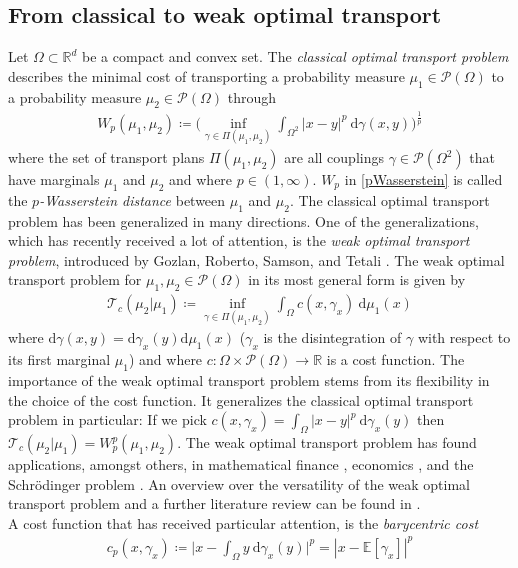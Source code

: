 \documentclass[letterpaper]{amsart}
\newcommand{\RR}{\mathbb{R}}
\newcommand{\EE}{\mathbb{E}}
\newcommand{\dd}{\mathrm{d}}
\theoremstyle{definition}
\begin{document}
\subsection{From classical to weak optimal transport}
Let $\Omega\subset\RR^d$ be a compact and convex set.
The \textit{classical optimal transport problem} describes the minimal cost of transporting a probability measure $\mu_1\in\mathcal P(\Omega)$ to a probability measure $\mu_2\in\mathcal P(\Omega)$ through
\begin{gather}\label{pWasserstein}
	W_p(\mu_1,\mu_2)\coloneqq \Big(\inf_{\gamma\in\Pi(\mu_1,\mu_2)}\int_{\Omega^2} |x-y|^p\ \dd\gamma(x,y)\Big)^{\frac{1}{p}}
\end{gather}
where the set of transport plans $\Pi(\mu_1,\mu_2)$ are all couplings $\gamma\in\mathcal P(\Omega^2)$ that have marginals $\mu_1$ and $\mu_2$ and where $p\in (1,\infty)$. $W_p$ in \eqref{pWasserstein} is called the \textit{$p$-Wasserstein distance} between $\mu_1$ and $\mu_2$. The classical optimal transport problem has been generalized in many directions. One of the generalizations, which has recently received a lot of attention, is the \textit{weak optimal transport problem}, introduced by Gozlan, Roberto, Samson, and Tetali \cite{gozlan2017}. The weak optimal transport problem for $\mu_1,\mu_2\in\mathcal P(\Omega)$ in its most general form is given by
\begin{gather*}
	\mathcal T_c(\mu_2|\mu_1)\coloneqq \inf_{\gamma\in\Pi(\mu_1,\mu_2)}\int_{\Omega}c(x,\gamma_x)\ \dd\mu_1(x)
\end{gather*}
where $\dd\gamma(x,y)=\dd \gamma_x(y)\dd\mu_1(x)$ ($\gamma_x$ is the disintegration of $\gamma$ with respect to its first marginal $\mu_1$) and where $c:\Omega\times \mathcal P(\Omega)\rightarrow\RR$ is a cost function. The importance of the weak optimal transport problem stems from its flexibility in the choice of the cost function. It generalizes the classical optimal transport problem in particular: If we pick $c(x,\gamma_x)=\int_{\Omega}|x-y|^p\ \dd \gamma_x(y)$ then $\mathcal T_c(\mu_2|\mu_1)=W_p^p(\mu_1,\mu_2)$.
The weak optimal transport problem has found applications, amongst others, in mathematical finance \cite{acciaio2021}, economics \cite{paty2022}, and the Schr{\"o}dinger problem \cite{backhoff2022}. An overview over the versatility of the weak optimal transport problem and a further literature review can be found in \cite{backhoff2022}.\\
A cost function that has received particular attention, is the \textit{barycentric cost}
\begin{gather}\label{weakbarycentriccost}
	c_p(x,\gamma_x)\coloneqq\Big|x-\int_{\Omega}y\ \dd \gamma_x(y)\Big|^p=|x-\EE[\gamma_x]|^p
\end{gather}
\end{document}
